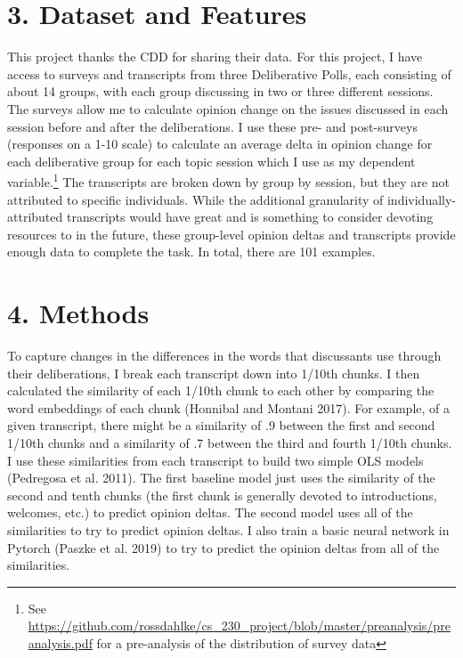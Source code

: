 \documentclass[12pt,]{article}
\begin{document}
\hypertarget{dataset-and-features}{%
\section{3. Dataset and Features}\label{dataset-and-features}}

This project thanks the CDD for sharing their data. For this project, I
have access to surveys and transcripts from three Deliberative Polls,
each consisting of about 14 groups, with each group discussing in two or
three different sessions. The surveys allow me to calculate opinion
change on the issues discussed in each session before and after the
deliberations. I use these pre- and post-surveys (responses on a 1-10
scale) to calculate an average delta in opinion change for each
deliberative group for each topic session which I use as my dependent
variable.\footnote{See
  \url{https://github.com/rossdahlke/cs_230_project/blob/master/preanalysis/preanalysis.pdf}
  for a pre-analysis of the distribution of survey data} The transcripts
are broken down by group by session, but they are not attributed to
specific individuals. While the additional granularity of
individually-attributed transcripts would have great and is something to
consider devoting resources to in the future, these group-level opinion
deltas and transcripts provide enough data to complete the task. In
total, there are 101 examples.

\hypertarget{methods}{%
\section{4. Methods}\label{methods}}

To capture changes in the differences in the words that discussants use
through their deliberations, I break each transcript down into 1/10th
chunks. I then calculated the similarity of each 1/10th chunk to each
other by comparing the word embeddings of each chunk (Honnibal and
Montani 2017). For example, of a given transcript, there might be a
similarity of .9 between the first and second 1/10th chunks and a
similarity of .7 between the third and fourth 1/10th chunks. I use these
similarities from each transcript to build two simple OLS models
(Pedregosa et al. 2011). The first baseline model just uses the
similarity of the second and tenth chunks (the first chunk is generally
devoted to introductions, welcomes, etc.) to predict opinion deltas. The
second model uses all of the similarities to try to predict opinion
deltas. I also train a basic neural network in Pytorch (Paszke et al.
2019) to try to predict the opinion deltas from all of the similarities.
\end{document}

